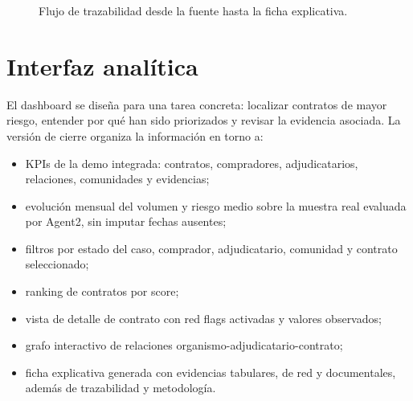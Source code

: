 \documentclass[11pt,a4paper,spanish]{book}
\numberwithin{equation}{chapter}
\numberwithin{figure}{chapter}
\begin{document}
\begin{figure}[ht]
\centering
{}
\caption{Flujo de trazabilidad desde la fuente hasta la ficha explicativa.}
\label{fig:trazabilidad_ficha_riesgo}
\end{figure}

\section{Interfaz anal{\'i}tica}
\label{sec:interfaz_cap6}

El dashboard se dise{\~n}a para una tarea concreta: localizar contratos de mayor riesgo, entender por qu{\'e} han sido priorizados y revisar la evidencia asociada. La versi{\'o}n de cierre organiza la informaci{\'o}n en torno a:

\begin{itemize}
  \item KPIs de la demo integrada: contratos, compradores, adjudicatarios, relaciones, comunidades y evidencias;
  \item evoluci{\'o}n mensual del volumen y riesgo medio sobre la muestra real evaluada por Agent2, sin imputar fechas ausentes;
  \item filtros por estado del caso, comprador, adjudicatario, comunidad y contrato seleccionado;
  \item ranking de contratos por score;
  \item vista de detalle de contrato con red flags activadas y valores observados;
  \item grafo interactivo de relaciones organismo-adjudicatario-contrato;
  \item ficha explicativa generada con evidencias tabulares, de red y documentales, adem{\'a}s de trazabilidad y metodolog{\'i}a.
\end{itemize}
\end{document}
